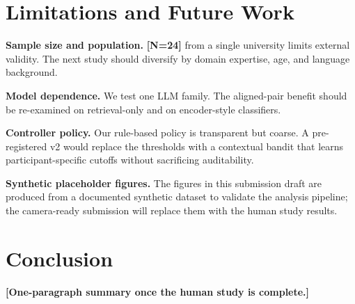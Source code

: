 \documentclass[sigchi, anonymous=true, review=true]{acmart}
\newcommand{\chiplaceholder}[1]{{\color{red}\textbf{[#1]}}}
\begin{document}
\section{Limitations and Future Work}
\label{sec:limits}

\textbf{Sample size and population.} \chiplaceholder{N=24} from a single
university limits external validity. The next study should diversify by
domain expertise, age, and language background.

\textbf{Model dependence.} We test one LLM family. The aligned-pair benefit
should be re-examined on retrieval-only and on encoder-style classifiers.

\textbf{Controller policy.} Our rule-based policy is transparent but coarse.
A pre-registered v2 would replace the thresholds with a contextual bandit
that learns participant-specific cutoffs without sacrificing auditability.

\textbf{Synthetic placeholder figures.} The figures in this submission draft
are produced from a documented synthetic dataset to validate the analysis
pipeline; the camera-ready submission will replace them with the human
study results.

\section{Conclusion}

\chiplaceholder{One-paragraph summary once the human study is complete.}



\end{document}
